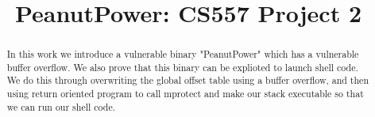 \documentclass[10pt, conference, letterpaper]{IEEEtran}
\begin{document}
\graphicspath{ {images/} }
\newcommand{\sysname}{ModiPick\xspace}
\newcommand{\Brittany}[1]{{\color{red}\textbf{Brittany: \textit{#1}}}}
\newcommand{\sam}[1]{{\color{blue}\textbf{Sam: \textit{#1}}}}
\newcommand{\eat}[1]{}



\title{PeanutPower: CS557 Project 2
}

\author{
\and
{}
}

\maketitle

\begin{abstract}
In this work we introduce a vulnerable binary "PeanutPower" which has a vulnerable buffer overflow. We also prove that this binary can be explioted to launch shell code. We do this through overwriting the global offset table using a buffer overflow, and then using return oriented program to call mprotect and make our stack executable so that we can run our shell code. 
\end{abstract}









%
%
\end{document}
